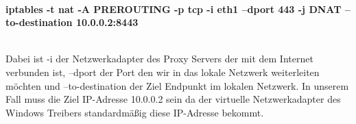 \\ 
\begin{center}
    \textbf{iptables -t nat -A PREROUTING -p tcp -i eth1 --dport 443 -j DNAT --to-destination 10.0.0.2:8443}
\end{center}
\ \\
Dabei ist -i der Netzwerkadapter des Proxy Servers der mit dem Internet verbunden ist, --dport der Port den wir in das lokale Netzwerk weiterleiten möchten und --to-destination der Ziel Endpunkt im lokalen Netzwerk. In unserem Fall muss die Ziel IP-Adresse 10.0.0.2 sein da der virtuelle Netzwerkadapter des Windows Treibers standardmäßig diese IP-Adresse bekommt. 